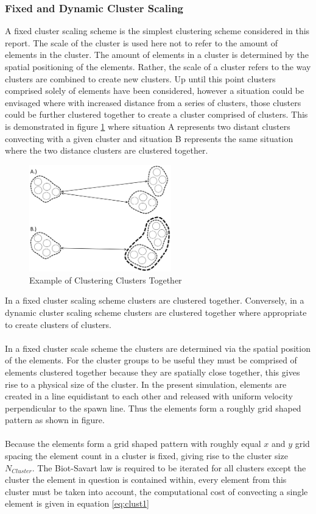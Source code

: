 \subsubsection{Fixed and Dynamic Cluster Scaling}
A fixed cluster scaling scheme is the simplest clustering scheme considered in this report. The scale of the cluster is used here not to refer to the amount of elements in the cluster. The amount of elements in a cluster is determined by the spatial positioning of the elements. Rather, the scale of a cluster refers to the way clusters are combined to create new clusters. Up until this point clusters comprised solely of elements have been considered, however a situation could be  envisaged where with increased distance from a series of clusters, those clusters could be further clustered together to create a cluster comprised of clusters. This is demonstrated in figure \ref{fig:ClustClust} where situation A represents two distant clusters convecting with a given cluster and situation B represents the same situation where the two distance clusters are clustered together.

\begin{figure}[H]
\centering
\includegraphics[width=0.55\textwidth]{Figures/ClusterCluster.png}
\caption{\label{fig:ClustClust}Example of Clustering Clusters Together}
\end{figure}

In a fixed cluster scaling scheme clusters are clustered together. Conversely, in a dynamic cluster scaling scheme clusters are clustered together where appropriate to create clusters of clusters.
\\\\
In a fixed cluster scale scheme the clusters are determined via the spatial position of the elements. For the cluster groups to be useful they must be comprised of elements clustered together because they are spatially close together, this gives rise to a physical size of the cluster. In the present simulation, elements are created in a line equidistant to each other and released with uniform velocity perpendicular to the spawn line. Thus the 
elements form a roughly grid shaped pattern as shown in figure.
\\\\
Because the elements form a grid shaped pattern with roughly equal $x$ and $y$ grid spacing the element count in a cluster is fixed, giving rise to the cluster size $N_{Cluster}$. The Biot-Savart law is required to be iterated for all clusters except the cluster the element in question is contained within,  every element from this cluster must be taken into account, the computational cost of convecting a single element is given in equation \ref{eq:clust1}

